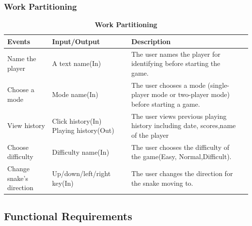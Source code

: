 \documentclass[12pt, titlepage]{article}
\begin{document}
\subsubsection{Work Partitioning}
\begin{table}[!htbp]
\caption{\bf Work Partitioning}
\begin{tabularx}{\textwidth}{p{3cm}p{4cm}p{5.5cm}X}
\toprule {\bf Events} & {\bf Input/Output} & {\bf Description}\\
\midrule
Name the player & A text name(In) & The user names the player for identifying before starting the game.\\
Choose a mode & Mode name(In) & The user chooses a mode (single-player mode or two-player mode) before starting a game.\\
View history & Click history(In) \newline Playing history(Out) & The user views previous playing history including date, scores,name of the player\\
Choose difficulty & Difficulty name(In) & The user chooses the difficulty of the game(Easy, Normal,Difficult).\\
Change snake's direction & Up/down/left/right key(In) & The user changes the direction for the snake moving to.\\

\bottomrule
\end{tabularx}
\end{table}


\subsection{Functional Requirements}
\end{document}
